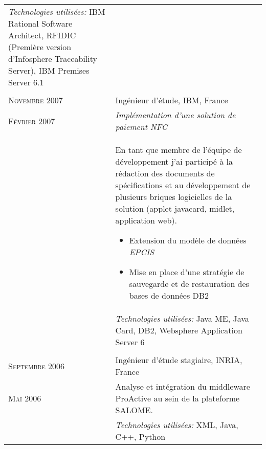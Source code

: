 \begin{longtable}{R{2.5cm}|p{14.8cm}}
	\footnotesize{\emph{Technologies utilisées:} IBM Rational Software Architect, RFIDIC (Première version d'Infosphere Traceability Server), IBM Premises Server 6.1 } \\
	                                                                                                                                                \\
	\textsc{Novembre 2007}  & Ingénieur d'étude, \textsc{IBM}, France                                                                                                   \\
	\textsc{Février 2007}   & \emph{Implémentation d'une solution de paiement NFC}                                                                                      \\&
	\footnotesize{
		En tant que membre de l'équipe de développement j'ai
		participé à la rédaction des documents de spécifications et au développement de
		plusieurs briques logicielles de la solution (applet javacard, midlet,
		application web).
		\begin{itemize}
			\item Extension du modèle de données \emph{EPCIS}
			\item Mise en place d'une stratégie de sauvegarde et de restauration des bases de données DB2
		\end{itemize}
		\vspace{-1em}
	}                                                                                                                                                                   \\&
	\footnotesize{\emph{Technologies utilisées:} Java ME, Java Card, DB2, Websphere Application Server 6 }                                                              \\
	                                                                                                                                                \\
	\textsc{Septembre 2006} & Ingénieur d'étude stagiaire, \textsc{INRIA}, France                                                                                       \\
	\textsc{Mai 2006}       & \footnotesize{Analyse et intégration du middleware ProActive au sein de la plateforme SALOME.}                                            \\&
	\footnotesize{\emph{Technologies utilisées:} XML, Java, C++, Python}                                                                                                \\

\end{longtable}
